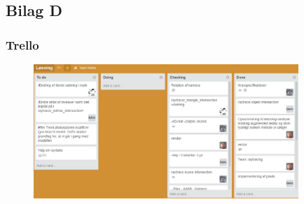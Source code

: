 \documentclass[oneside,a4paper,titlepage]{article}
\begin{document}
\subsection{Bilag D}

\subsubsection*{Trello}
\label{sec:trello}

\begin{figure}[H]
   \centering
   \includegraphics[width=10cm]{./../graphics/trello}
\end{figure}
\end{document}
